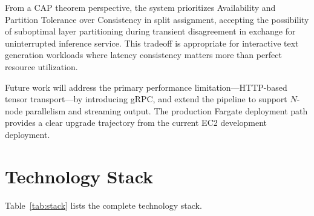 \documentclass[conference]{IEEEtran}
\begin{document}
From a CAP theorem perspective, the system prioritizes Availability and
Partition Tolerance over Consistency in split assignment, accepting the
possibility of suboptimal layer partitioning during transient disagreement in
exchange for uninterrupted inference service. This tradeoff is appropriate for
interactive text generation workloads where latency consistency matters more
than perfect resource utilization.

Future work will address the primary performance limitation---HTTP-based tensor
transport---by introducing gRPC, and extend the pipeline to support $N$-node
parallelism and streaming output. The production Fargate deployment path
provides a clear upgrade trajectory from the current EC2 development
deployment.

\appendix

\section{Technology Stack}

Table~\ref{tab:stack} lists the complete technology stack.
\end{document}
